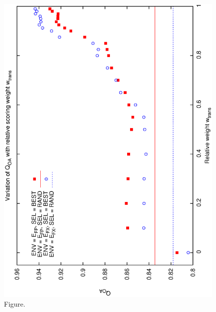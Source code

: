 \documentclass[12pt,a4paper]{article}
\begin{document}
\begin{figure}[htbp]
 \begin{center}
  \includegraphics[scale=1.0, angle=0]{figures/cs1_dw1a2_oa.eps}
 \end{center}
  \caption[Figure.]
{Figure.}
\end{figure}
\clearpage
\end{document}
